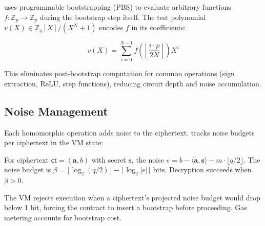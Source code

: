 \Zoo{} uses programmable bootstrapping (PBS) to evaluate arbitrary functions $f: \mathbb{Z}_p \to \mathbb{Z}_p$ during the bootstrap step itself. The test polynomial $v(X) \in \mathbb{Z}_q[X]/(X^N+1)$ encodes $f$ in its coefficients:

\begin{equation}
  v(X) = \sum_{i=0}^{N-1} f\!\left(\left\lfloor \frac{i \cdot p}{2N} \right\rfloor\right) X^i
\end{equation}

This eliminates post-bootstrap computation for common operations (sign extraction, ReLU, step functions), reducing circuit depth and noise accumulation.

\subsection{Noise Management}

Each homomorphic operation adds noise to the ciphertext. \Zoo{} tracks noise budgets per ciphertext in the VM state:

\begin{definition}
For ciphertext $\mathsf{ct} = (\mathbf{a}, b)$ with secret $\mathbf{s}$, the noise $e = b - \langle \mathbf{a}, \mathbf{s} \rangle - m \cdot \lfloor q/2 \rfloor$. The noise budget is $\beta = \lfloor \log_2(q/2) \rfloor - \lceil \log_2 |e| \rceil$ bits. Decryption succeeds when $\beta > 0$.
\end{definition}

The VM rejects execution when a ciphertext's projected noise budget would drop below 1 bit, forcing the contract to insert a bootstrap before proceeding. Gas metering accounts for bootstrap cost.

